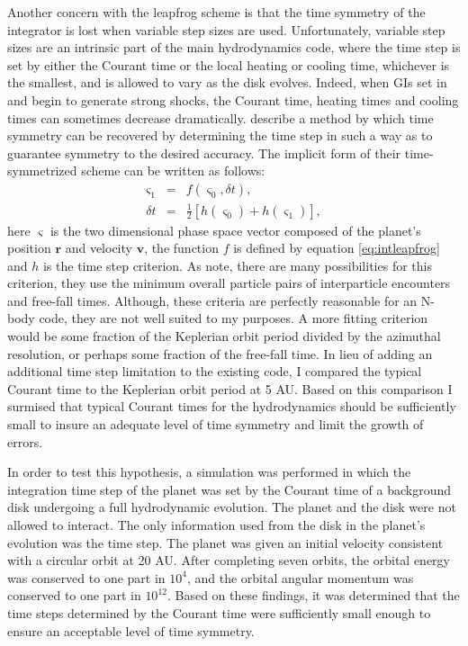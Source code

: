 Another concern with the leapfrog scheme is that the time symmetry of the integrator is lost when variable step sizes are used. Unfortunately, variable step sizes are an intrinsic part of the main hydrodynamics code, where the time step is set by either the Courant time or the local heating or cooling time, whichever is the smallest, and is allowed to vary as the disk evolves. Indeed, when GIs set in and begin to generate strong shocks, the Courant time, heating times and cooling times can sometimes decrease dramatically. \citet{hut1995} describe a method by which time symmetry can be recovered by determining the time step in such a way as to guarantee symmetry to the desired accuracy. The implicit form of their time-symmetrized scheme can be written as follows:
\begin{subequations}
\begin{eqnarray}
\varsigma_1&=&f(\varsigma_0,\delta t),\\
\delta t &=& \frac{1}{2}[ h(\varsigma_0) + h (\varsigma_1)],
\end{eqnarray}
\end{subequations}
here $\varsigma$ is the two dimensional phase space vector composed of the planet's position $\boldsymbol{r}$ and velocity $\boldsymbol{v}$, the function $f$ is defined by equation \eqref{eq:intleapfrog} and $h$ is the time step criterion. As \citet{hut1995} note, there are many possibilities for this criterion, they use the minimum overall particle pairs of interparticle encounters and free-fall times. Although, these criteria are perfectly reasonable for an N-body code, they are not well suited to my purposes. A more fitting criterion would be some fraction of the Keplerian orbit period divided by the azimuthal resolution, or perhaps some fraction of the free-fall time. In lieu of adding an additional time step limitation to the existing code, I compared the typical Courant time to the Keplerian orbit period at 5 AU. Based on this comparison I surmised that typical Courant times for the hydrodynamics should be sufficiently small to insure an adequate level of time symmetry and limit the growth of errors. 

In order to test this hypothesis,  a simulation was performed in which the integration time step of the planet was set by the Courant time of a background disk undergoing a full hydrodynamic evolution. The planet and the disk were not allowed to interact. The only information used from the disk in the planet's evolution was the time step. The planet was given an initial velocity consistent with a circular orbit at 20 AU. After completing seven orbits, the orbital energy was conserved to one part in $10^4$, and the orbital angular momentum was conserved to one part in $10^{12}$. Based on these findings, it was determined that the time steps determined by the Courant time were sufficiently small enough to ensure an acceptable level of time symmetry.

